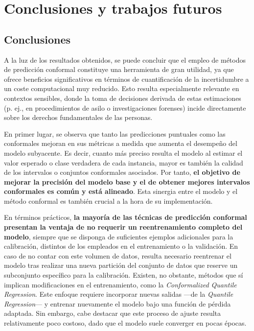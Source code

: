 \chapter{Conclusiones y trabajos futuros}

\section{Conclusiones}



A la luz de los resultados obtenidos, se puede concluir que el empleo de métodos de predicción conformal constituye una herramienta de gran utilidad, ya que ofrece beneficios significativos en términos de cuantificación de la incertidumbre a un coste computacional muy reducido. Esto resulta especialmente relevante en contextos sensibles, donde la toma de decisiones derivada de estas estimaciones (p. ej., en procedimientos de asilo o investigaciones forenses) incide directamente sobre los derechos fundamentales de las personas.


En primer lugar, se observa que tanto las predicciones puntuales como las conformales mejoran en sus métricas a medida que aumenta el desempeño del modelo subyacente. Es decir, cuanto más preciso resulta el modelo al estimar el valor esperado o clase verdadera de cada instancia, mayor es también la calidad de los intervalos o conjuntos conformales asociados. Por tanto, \textbf{el objetivo de mejorar la precisión del modelo base y el de obtener mejores intervalos conformales es común y está alineado}. Esta sinergia entre el modelo y el método conformal es también crucial a la hora de su implementación.

En términos prácticos, \textbf{la mayoría de las técnicas de predicción conformal presentan la ventaja de no requerir un reentrenamiento completo del modelo}, siempre que se disponga de suficientes ejemplos adicionales para la calibración, distintos de los empleados en el entrenamiento o la validación. En caso de no contar con este volumen de datos, resulta necesario reentrenar el modelo tras realizar una nueva partición del conjunto de datos que reserve un subconjunto específico para la calibración.
Existen, no obstante, métodos que sí implican modificaciones en el entrenamiento, como la \textit{Conformalized Quantile Regression}. Este enfoque requiere incorporar nuevas salidas ---de la \textit{Quantile Regression}--- y entrenar nuevamente el modelo bajo una función de pérdida adaptada. Sin embargo, cabe destacar que este proceso de ajuste resulta relativamente poco costoso, dado que el modelo suele converger en pocas épocas.


